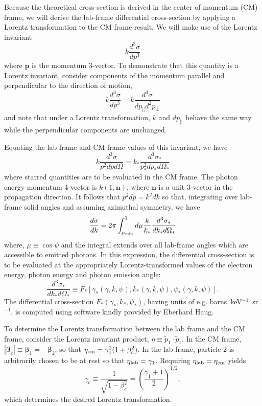 \documentclass[12pt]{article}
\begin{document}
Because the theoretical cross-section is derived in the center
of momentum (CM) frame, we will derive the lab-frame
differential cross-section by applying a Lorentz transformation
to the CM frame result.  We will make use of the Lorentz
invariant
\begin{equation}
   k \frac{d^3\sigma}{dp^3}
\end{equation}
where ${\bm p}$ is the momentum 3-vector.
To demonstrate that this quantity is a Lorentz invariant,
consider components of the momentum parallel and perpendicular
to the direction of motion,
\begin{equation}
   k \frac{d^3\sigma}{dp^3} = k \frac{d^3\sigma}{dp_{||}d^2p_\perp}
\end{equation}
and note that under a Lorentz transformation,
$k$ and $dp_{||}$ behave the same way while the perpendicular
components are unchanged.

Equating the lab frame and CM frame values
of this invariant, we have
\begin{equation}
 k \frac{d^3\sigma}{p^2 dp d\Omega} =
  k_* \frac{d^3\sigma_*}{p_*^2 dp_* d\Omega_*}
\end{equation}
where starred quantities are to be evaluated in the CM frame.
The photon energy-momentum 4-vector is $k(1,{\bm n})$, where
${\bm n}$ is a unit 3-vector in the propagation direction.  It
follows that $p^2 dp = k^2 dk$ so that, integrating over
lab-frame solid angles and assuming azimuthal symmetry, we have
\begin{equation}
  \frac{d\sigma}{dk} =
   2\pi \int_{\mu_{\rm min}}^1 d\mu \frac{k}{k_*}
  \frac{d^3\sigma_*}{dk_* d\Omega_*}
\label{sigma-angular-integral}
\end{equation}
where, $\mu \equiv \cos\psi$ and the integral extends over all lab-frame angles
which are accessible to emitted photons.  In this expression,
the differential cross-section is to be evaluated at
the appropriately Lorentz-transformed values of the electron
energy, photon energy and photon emission angle:
\begin{equation}
\frac{d^3\sigma_*}{dk_* d\Omega_*} \equiv
F_*\left[\gamma_*(\gamma, k, \psi), k_*(\gamma, k, \psi), \psi_*(\gamma, k, \psi)\right].
\end{equation}
The differential cross-section $F_*(\gamma_*, k_*, \psi_*)$,
having units of e.g. barns~keV${}^{-1}$~sr${}^{-1}$, is computed using
software kindly provided by Eberhard Haug.

To determine the Lorentz transformation between the lab
frame and the CM frame, consider the Lorentz invariant
product, $\eta \equiv {\tilde p_1}\cdot{\tilde p_1}$.
In the CM frame, $|{\bm \beta_c}| \equiv {\bm \beta_1} = -{\bm \beta_2}$, so that
$\eta_{\rm cm} = \gamma_c^2 (1+\beta_c^2)$.  In the lab frame,
particle 2 is arbitrarily chosen to be at rest so that
$\eta_{\rm lab} = \gamma_1$.  Requiring $\eta_{\rm lab} =
\eta_{\rm cm}$ yields
\begin{equation}
  \gamma_c \equiv \frac{1}{\sqrt{1 - \beta_c^2}} =
\left(\frac{\gamma_1 + 1}{2}\right)^{1/2},
\end{equation}
which determines the desired Lorentz transformation.
\end{document}
